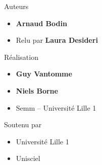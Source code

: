 \begin{frame}
\begin{minipage}{0.90\textwidth}
  Auteurs
  \begin{itemize}
  \item {\bf Arnaud Bodin}

  \item Relu par {\bf Laura Desideri}
    
  \end{itemize}

  \smallskip

  Réalisation
  \begin{itemize}
    \item {\bf Guy Vantomme}
    \item {\bf Niels Borne} 
    \item Semm -- Université Lille 1
  \end{itemize}

  \smallskip

  Soutenu par 
  \begin{itemize}
    \item Université Lille 1
    \item Unisciel
  \end{itemize}

  \end{minipage}  



\end{frame}


